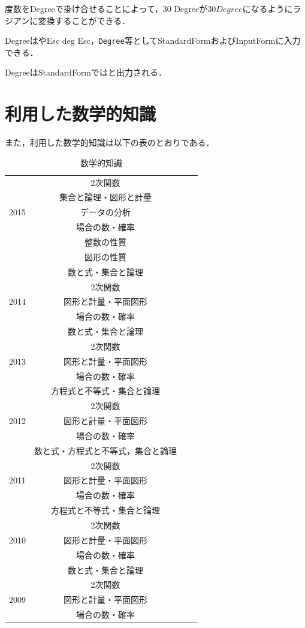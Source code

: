 度数をDegreeで掛け合せることによって，30 Degreeが$30 Degree$になるようにラジアンに変換することができる．

DegreeはやEsc deg Esc，\verb|Degree|等としてStandardFormおよびInputFormに入力できる．

DegreeはStandardFormではと出力される．

\clearpage

\section{利用した数学的知識}

また，利用した数学的知識は以下の表のとおりである．

\begin{table}[h]
  \begin{center}
    \caption{数学的知識}
  \begin{tabular}{|l|c|r||r|} \hline
& 2次関数 \\ \cline{2-2}
& 集合と論理・図形と計量 \\ \cline{2-2}
 2015 & データの分析 \\ \cline{2-2}
& 場合の数・確率 \\ \cline{2-2}
& 整数の性質 \\ \cline{2-2}
&図形の性質 \\ \hline
& 数と式・集合と論理 \\ \cline{2-2}
& 2次関数 \\ \cline{2-2}
 2014 & 図形と計量・平面図形 \\ \cline{2-2}
& 場合の数・確率  \\ \hline
& 数と式・集合と論理 \\ \cline{2-2}
& 2次関数 \\ \cline{2-2}
 2013 & 図形と計量・平面図形 \\ \cline{2-2}
& 場合の数・確率 \\ \hline
& 方程式と不等式・集合と論理 \\ \cline{2-2}
& 2次関数 \\ \cline{2-2}
 2012 & 図形と計量・平面図形 \\ \cline{2-2}
& 場合の数・確率 \\ \hline
& 数と式・方程式と不等式，集合と論理 \\ \cline{2-2}
& 2次関数 \\ \cline{2-2}
 2011 & 図形と計量・平面図形 \\ \cline{2-2}
& 場合の数・確率 \\ \hline
& 方程式と不等式・集合と論理 \\ \cline{2-2}
& 2次関数 \\ \cline{2-2}
 2010 & 図形と計量・平面図形 \\ \cline{2-2}
& 場合の数・確率 \\ \hline
& 数と式・集合と論理 \\ \cline{2-2}
& 2次関数 \\ \cline{2-2}
 2009 & 図形と計量・平面図形 \\ \cline{2-2}
& 場合の数・確率 \\ \hline
\end{tabular}
  \end{center}
\end{table}



